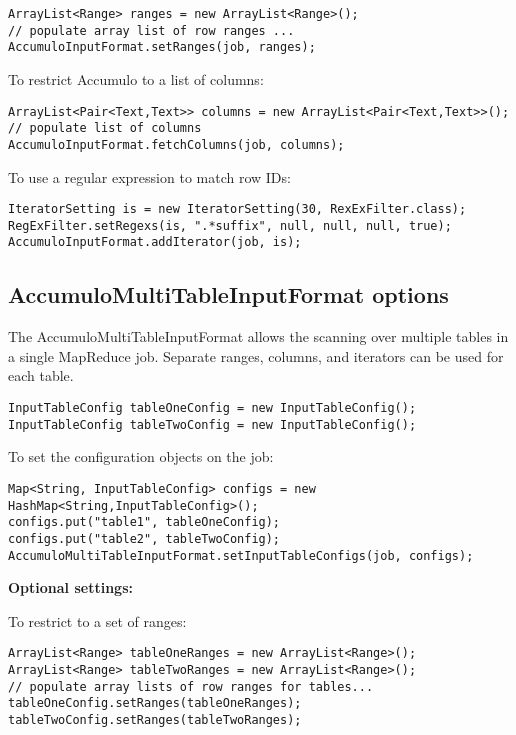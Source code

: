 \small
\begin{verbatim}
ArrayList<Range> ranges = new ArrayList<Range>();
// populate array list of row ranges ...
AccumuloInputFormat.setRanges(job, ranges);
\end{verbatim}
\normalsize

To restrict Accumulo to a list of columns:

\small
\begin{verbatim}
ArrayList<Pair<Text,Text>> columns = new ArrayList<Pair<Text,Text>>();
// populate list of columns
AccumuloInputFormat.fetchColumns(job, columns);
\end{verbatim}
\normalsize

To use a regular expression to match row IDs:

\small
\begin{verbatim}
IteratorSetting is = new IteratorSetting(30, RexExFilter.class);
RegExFilter.setRegexs(is, ".*suffix", null, null, null, true);
AccumuloInputFormat.addIterator(job, is);
\end{verbatim}
\normalsize

\subsection{AccumuloMultiTableInputFormat options}

The AccumuloMultiTableInputFormat allows the scanning over multiple tables 
in a single MapReduce job. Separate ranges, columns, and iterators can be 
used for each table. 

\small
\begin{verbatim}
InputTableConfig tableOneConfig = new InputTableConfig();
InputTableConfig tableTwoConfig = new InputTableConfig();
\end{verbatim}
\normalsize

To set the configuration objects on the job:

\small
\begin{verbatim}
Map<String, InputTableConfig> configs = new HashMap<String,InputTableConfig>();
configs.put("table1", tableOneConfig);
configs.put("table2", tableTwoConfig);
AccumuloMultiTableInputFormat.setInputTableConfigs(job, configs);
\end{verbatim}
\normalsize

\Large
\textbf{Optional settings:}
\normalsize

To restrict to a set of ranges:

\small
\begin{verbatim}
ArrayList<Range> tableOneRanges = new ArrayList<Range>();
ArrayList<Range> tableTwoRanges = new ArrayList<Range>();
// populate array lists of row ranges for tables...
tableOneConfig.setRanges(tableOneRanges);
tableTwoConfig.setRanges(tableTwoRanges);
\end{verbatim}
\normalsize

